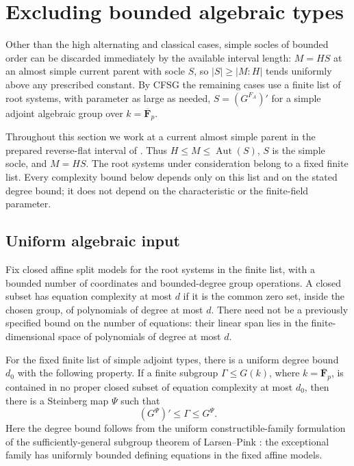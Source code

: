 \section{Excluding bounded algebraic types}\label{sec:bounded}

Other than the high alternating and classical cases, simple socles of bounded order can be discarded immediately by the available interval length: \(M=HS\) at an almost simple current parent with socle \(S\), so \(|S|\ge|M:H|\) tends uniformly above any prescribed constant. By CFSG the remaining cases use a finite list of root systems, with parameter as large as needed, \(S=(G^{F_A})'\) for a simple adjoint algebraic group over \(k=\overline{\mathbf F}_p\).

Throughout this section we work at a current almost simple parent in the prepared reverse-flat interval of . Thus $H\le M\le\operatorname{Aut}(S)$, $S$ is the simple socle, and $M=HS$. The root systems under consideration belong to a fixed finite list. Every complexity bound below depends only on this list and on the stated degree bound; it does not depend on the characteristic or the finite-field parameter.

\subsection{Uniform algebraic input}

\begin{definition}\label{w:complexity}
Fix closed affine split models for the root systems in the finite list, with a bounded number of coordinates and bounded-degree group operations. A closed subset has equation complexity at most $d$ if it is the common zero set, inside the chosen group, of polynomials of degree at most $d$. There need not be a previously specified bound on the number of equations: their linear span lies in the finite-dimensional space of polynomials of degree at most $d$.
\end{definition}

\begin{theorem}\label{w:lp}
For the fixed finite list of simple adjoint types, there is a uniform degree bound $d_0$ with the following property. If a finite subgroup $\Gamma\le G(k)$, where $k=\overline{\mathbf F}_p$, is contained in no proper closed subset of equation complexity at most $d_0$, then there is a Steinberg map $\Psi$ such that
\[
 (G^\Psi)'\le\Gamma\le G^\Psi.
\]
Here the degree bound follows from the uniform constructible-family
formulation of the sufficiently-general subgroup theorem of
Larsen--Pink \citep[Theorem~0.5 and Metadefinition~2.2]{LarsenPink2011}:
the exceptional family has uniformly bounded defining equations in
the fixed affine models.
\end{theorem}

